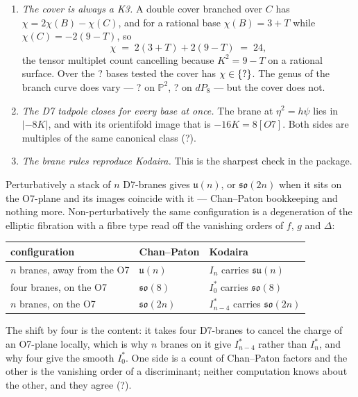 \documentclass[11pt,a4paper]{article}
\newcommand{\SFSenBases}{?}\newcommand{\SFSenGenusPTwo}{?}
\newcommand{\SFSenGenusDPEight}{?}\newcommand{\SFSenTadpoleAll}{?}
\newcommand{\SFBraneKodairaAgree}{?}\newcommand{\SFCicyTotal}{?}
\newcommand{\PP}{\mathbb{P}}
\newcommand{\g}[1]{\mathfrak{#1}}
\theoremstyle{definition}
\begin{document}
\begin{enumerate}[leftmargin=2em]
\item \emph{The cover is always a K3.} A double cover branched over $C$ has
$\chi = 2\chi(B) - \chi(C)$, and for a rational base $\chi(B) = 3 + T$ while
$\chi(C) = -2(9-T)$, so
%
\begin{equation}
\chi \;=\; 2(3+T) + 2(9-T) \;=\; 24 ,
\label{eq:k3}
\end{equation}
%
the tensor multiplet count cancelling because $K^2 = 9 - T$ on a rational
surface. Over the \SFSenBases{} bases tested the cover has
$\chi \in \{?\}$. The genus of the branch curve does vary ---
\SFSenGenusPTwo{} on $\PP^2$, \SFSenGenusDPEight{} on $dP_8$ --- but the cover
does not.

\item \emph{The D7 tadpole closes for every base at once.} The brane at
$\eta^2 = h\psi$ lies in $|-8K|$, and with its orientifold image that is
$-16K = 8[O7]$. Both sides are multiples of the same canonical class
(\SFSenTadpoleAll).

\item \emph{The brane rules reproduce Kodaira.} This is the sharpest check
in the package.
\end{enumerate}

Perturbatively a stack of $n$ D7-branes gives $\g{u}(n)$, or $\g{so}(2n)$ when
it sits on the O7-plane and its images coincide with it --- Chan--Paton
bookkeeping and nothing more. Non-perturbatively the same configuration is a
degeneration of the elliptic fibration with a fibre type read off the
vanishing orders of $f$, $g$ and $\Delta$:

\begin{center}
\begin{tabular}{lll}
\toprule
configuration & Chan--Paton & Kodaira \\
\midrule
$n$ branes, away from the O7 & $\g{u}(n)$    & $I_n$ carries $\g{su}(n)$ \\
four branes, on the O7       & $\g{so}(8)$   & $I_0^*$ carries $\g{so}(8)$ \\
$n$ branes, on the O7        & $\g{so}(2n)$  & $I_{n-4}^*$ carries $\g{so}(2n)$ \\
\bottomrule
\end{tabular}
\end{center}

\noindent
The shift by four is the content: it takes four D7-branes to cancel the charge
of an O7-plane locally, which is why $n$ branes on it give $I_{n-4}^*$ rather
than $I_n^*$, and why four give the smooth $I_0^*$. One side is a count of
Chan--Paton factors and the other is the vanishing order of a discriminant;
neither computation knows about the other, and they agree
(\SFBraneKodairaAgree).
\end{document}
